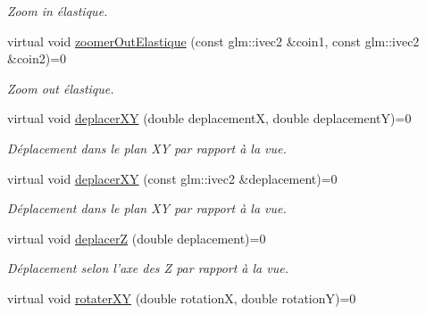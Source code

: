 \begin{DoxyCompactItemize}
\begin{DoxyCompactList}\small\item\em Zoom in élastique. \end{DoxyCompactList}\item 
\hypertarget{classvue_1_1_vue_a7f2121399c50dbec8db7a8d8fab78ddc}{virtual void \hyperlink{classvue_1_1_vue_a7f2121399c50dbec8db7a8d8fab78ddc}{zoomer\-Out\-Elastique} (const glm\-::ivec2 \&coin1, const glm\-::ivec2 \&coin2)=0}\label{classvue_1_1_vue_a7f2121399c50dbec8db7a8d8fab78ddc}

\begin{DoxyCompactList}\small\item\em Zoom out élastique. \end{DoxyCompactList}\item 
\hypertarget{classvue_1_1_vue_a8e4dec26a65250ec721b044333bf62ce}{virtual void \hyperlink{classvue_1_1_vue_a8e4dec26a65250ec721b044333bf62ce}{deplacer\-X\-Y} (double deplacement\-X, double deplacement\-Y)=0}\label{classvue_1_1_vue_a8e4dec26a65250ec721b044333bf62ce}

\begin{DoxyCompactList}\small\item\em Déplacement dans le plan X\-Y par rapport à la vue. \end{DoxyCompactList}\item 
\hypertarget{classvue_1_1_vue_a4019b90a0a76ca3eb3633dda3bcb397a}{virtual void \hyperlink{classvue_1_1_vue_a4019b90a0a76ca3eb3633dda3bcb397a}{deplacer\-X\-Y} (const glm\-::ivec2 \&deplacement)=0}\label{classvue_1_1_vue_a4019b90a0a76ca3eb3633dda3bcb397a}

\begin{DoxyCompactList}\small\item\em Déplacement dans le plan X\-Y par rapport à la vue. \end{DoxyCompactList}\item 
\hypertarget{classvue_1_1_vue_aa54f93fe75f0df62893e7f92f1466a33}{virtual void \hyperlink{classvue_1_1_vue_aa54f93fe75f0df62893e7f92f1466a33}{deplacer\-Z} (double deplacement)=0}\label{classvue_1_1_vue_aa54f93fe75f0df62893e7f92f1466a33}

\begin{DoxyCompactList}\small\item\em Déplacement selon l'axe des Z par rapport à la vue. \end{DoxyCompactList}\item 
\hypertarget{classvue_1_1_vue_a07067586589d8a391a18c3e1a4e9482e}{virtual void \hyperlink{classvue_1_1_vue_a07067586589d8a391a18c3e1a4e9482e}{rotater\-X\-Y} (double rotation\-X, double rotation\-Y)=0}\label{classvue_1_1_vue_a07067586589d8a391a18c3e1a4e9482e}


\end{DoxyCompactItemize}
